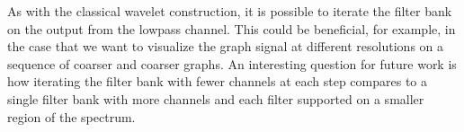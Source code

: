 \documentclass[journal, 10pt]{IEEEtran}
\begin{document}
As with the classical wavelet construction, it is possible to iterate the filter bank on the output from the lowpass channel.
This could be beneficial, for example, in the case that we want to visualize the graph signal at different resolutions on  a sequence of coarser and coarser graphs. An interesting question for future work is how iterating the filter bank with fewer channels at each step compares to a single filter bank with more channels and each filter supported on a smaller region of the spectrum.

\balance

{\small }
\end{document}
